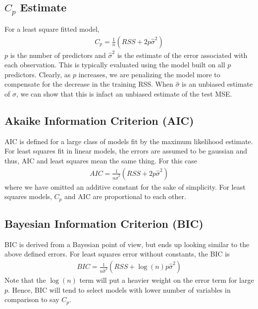 \documentclass[../statistical_learning_notes.tex]{subfiles}
\begin{document}
    \subsection{$C_{p}$ Estimate}
    For a least square fitted model,
    \begin{align*}
        C_{p} = \frac{1}{n}(RSS + 2p\hat{\sigma}^{2})
    \end{align*}
    $p$ is the number of predictors and $\hat{\sigma}^{2}$ is the estimate of the error associated with each observation. This is typically evaluated using the model built on all $p$ predictors.\newline
    Clearly, as $p$ increases, we are penalizing the model more to compensate for the decrease in the training RSS. When $\hat{\sigma}$ is an unbiased estimate of $\sigma$, we can show that this is infact an unbiased estimate of the test MSE.


    \subsection{Akaike Information Criterion (AIC)}
    AIC is defined for a large class of models fit by the maximum likelihood estimate.\newline
    For least squares fit in linear models, the errors are assumed to be gaussian and thus, AIC and least squares mean the same thing. For this case
    \begin{align*}
        AIC = \frac{1}{n\hat{\sigma}^2}(RSS + 2p\hat{\sigma}^2)
    \end{align*}
    where we have omitted an additive constant for the sake of simplicity.\newline
    For least squares models, $C_{p}$ and AIC are proportional to each other.


    \subsection{Bayesian Information Criterion (BIC)}
    BIC is derived from a Bayesian point of view, but ends up looking similar to the above defined errors.\newline
    For least squares error without constants, the BIC is
    \begin{align*}
        BIC = \frac{1}{n\hat{\sigma}^{2}} (RSS + \log(n)p\hat{\sigma}^{2})
    \end{align*}
    Note that the $\log(n)$ term will put a heavier weight on the error term for large $p$. Hence, BIC will tend to select models with lower number of variables in comparison to say $C_{p}$.
\end{document}
